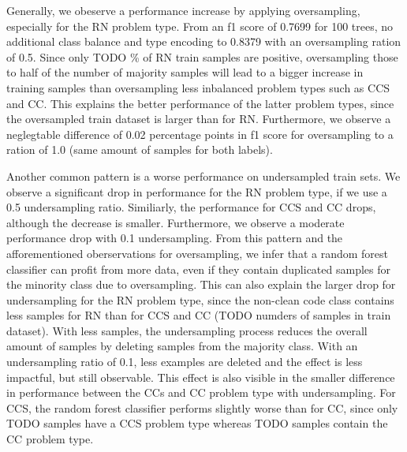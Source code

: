 Generally, we obeserve a performance increase by applying oversampling, especially for the RN problem type. From an f1 score of 0.7699 for 100 trees, no additional class balance and type encoding to 0.8379 with an oversampling ration of 0.5. Since only TODO \% of RN train samples are positive, oversampling those to half of the number of majority samples will lead to a bigger increase in training samples than oversampling less inbalanced problem types such as CCS and CC. This explains the better performance of the latter problem types, since the oversampled train dataset is larger than for RN. Furthermore, we observe a neglegtable difference of 0.02 percentage points in f1 score for oversampling to a ration of 1.0 (same amount of samples for both labels).

Another common pattern is a worse performance on undersampled train sets. We observe a significant drop in performance for the RN problem type, if we use a 0.5 undersampling ratio. Similiarly, the performance for CCS and CC drops, although the decrease is smaller. Furthermore, we observe a moderate performance drop with 0.1 undersampling. From this pattern and the afforementioned oberservations for oversampling, we infer that a random forest classifier can profit from more data, even if they contain duplicated samples for the minority class due to oversampling. This can also explain the larger drop for undersampling for the RN problem type, since the non-clean code class contains less samples for RN than for CCS and CC (TODO numders of samples in train dataset). With less samples, the undersampling process reduces the overall amount of samples by deleting samples from the majority class. With an undersampling ratio of 0.1, less examples are deleted and the effect is less impactful, but still observable. This effect is also visible in the smaller difference in performance between the CCs and CC problem type with undersampling. For CCS, the random forest classifier performs slightly worse than for CC, since only TODO samples have a CCS problem type whereas TODO samples contain the CC problem type.


